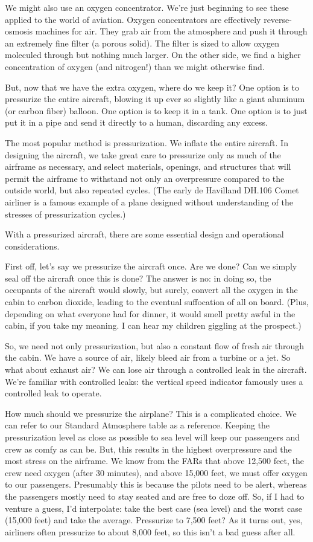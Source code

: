 We might also use an oxygen concentrator. We're just beginning to see these applied to the world of aviation. Oxygen concentrators are effectively reverse-osmosis machines for air. They grab air from the atmosphere and push it through an extremely fine filter (a porous solid). The filter is sized to allow oxygen moleculed through but nothing much larger. On the other side, we find a higher concentration of oxygen (and nitrogen!) than we might otherwise find.

But, now that we have the extra oxygen, where do we keep it? One option is to pressurize the entire aircraft, blowing it up ever so slightly like a giant aluminum (or carbon fiber) balloon. One option is to keep it in a tank. One option is to just put it in a pipe and send it directly to a human, discarding any excess.

The most popular method is pressurization. We inflate the entire aircraft. In designing the aircraft, we take great care to pressurize only as much of the airframe as necessary, and select materials, openings, and structures that will permit the airframe to withstand not only an overpressure compared to the outside world, but also repeated cycles. (The early de Havilland DH.106 Comet airliner is a famous example of a plane designed without understanding of the stresses of pressurization cycles.)

With a pressurized aircraft, there are some essential design and operational considerations.

First off, let's say we pressurize the aircraft once. Are we done? Can we simply seal off the aircraft once this is done? The answer is no: in doing so, the occupants of the aircraft would slowly, but surely, convert all the oxygen in the cabin to carbon dioxide, leading to the eventual suffocation of all on board. (Plus, depending on what everyone had for dinner, it would smell pretty awful in the cabin, if you take my meaning. I can hear my children giggling at the prospect.)

So, we need not only pressurization, but also a constant flow of fresh air through the cabin. We have a source of air, likely bleed air from a turbine or a jet. So what about exhaust air? We can lose air through a controlled leak in the aircraft. We're familiar with controlled leaks: the vertical speed indicator famously uses a controlled leak to operate.

How much should we pressurize the airplane? This is a complicated choice. We can refer to our Standard Atmosphere table as a reference. Keeping the pressurization level as close as possible to sea level will keep our passengers and crew as comfy as can be. But, this results in the highest overpressure and the most stress on the airframe. We know from the FARs that above 12,500 feet, the crew need oxygen (after 30 minutes), and above 15,000 feet, we must offer oxygen to our passengers. Presumably this is because the pilots need to be alert, whereas the passengers mostly need to stay seated and are free to doze off. So, if I had to venture a guess, I'd interpolate: take the best case (sea level) and the worst case (15,000 feet) and take the average. Pressurize to 7,500 feet? As it turns out, yes, airliners often pressurize to about 8,000 feet, so this isn't a bad guess after all.

